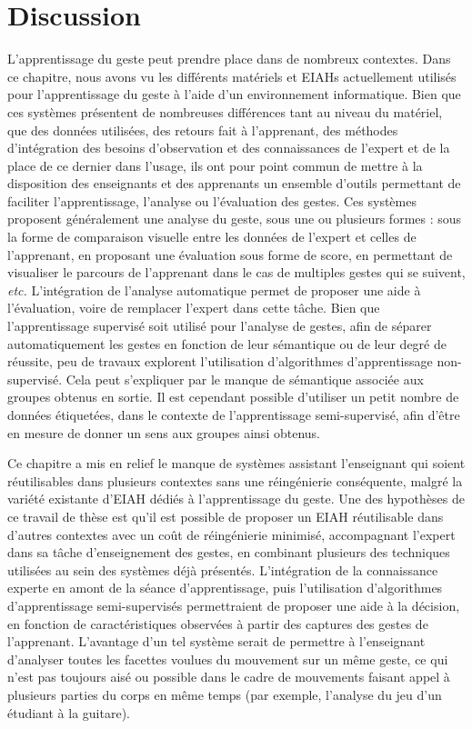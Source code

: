 \section{Discussion}
L'apprentissage du geste peut prendre place dans de nombreux contextes. Dans ce chapitre, nous avons vu les différents matériels et EIAHs actuellement utilisés pour l'apprentissage du geste à l'aide d'un environnement informatique. Bien que ces systèmes présentent de nombreuses différences tant au niveau du matériel, que des données utilisées, des retours fait à l'apprenant, des méthodes d'intégration des besoins d'observation et des connaissances de l'expert et de la place de ce dernier dans l'usage, ils ont pour point commun de mettre à la disposition des enseignants et des apprenants un ensemble d'outils permettant de faciliter l'apprentissage, l'analyse ou l'évaluation des gestes. Ces systèmes proposent généralement une analyse du geste, sous une ou plusieurs formes : sous la forme de comparaison visuelle entre les données de l'expert et celles de l'apprenant, en proposant une évaluation sous forme de score, en permettant de visualiser le parcours de l'apprenant dans le cas de multiples gestes qui se suivent, \textit{etc.} L'intégration de l'analyse automatique permet de proposer une aide à l'évaluation, voire de remplacer l'expert dans cette tâche. Bien que l'apprentissage supervisé soit utilisé pour l'analyse de gestes, afin de séparer automatiquement les gestes en fonction de leur sémantique ou de leur degré de réussite, peu de travaux explorent l'utilisation d'algorithmes d'apprentissage non-supervisé. Cela peut s'expliquer par le manque de sémantique associée aux groupes obtenus en sortie. Il est cependant possible d'utiliser un petit nombre de données étiquetées, dans le contexte de l'apprentissage semi-supervisé, afin d'être en mesure de donner un sens aux groupes ainsi obtenus.

Ce chapitre a mis en relief le manque de systèmes assistant l'enseignant qui soient réutilisables dans plusieurs contextes sans une réingénierie conséquente, malgré la variété existante d'EIAH dédiés à l'apprentissage du geste. Une des hypothèses de ce travail de thèse est qu'il est possible de proposer un EIAH réutilisable dans d'autres contextes avec un coût de réingénierie minimisé, accompagnant l'expert dans sa tâche d'enseignement des gestes, en combinant plusieurs des techniques utilisées au sein des systèmes déjà présentés. L'intégration de la connaissance experte en amont de la séance d'apprentissage, puis l'utilisation d'algorithmes d'apprentissage semi-supervisés permettraient de proposer une aide à la décision, en fonction de caractéristiques observées à partir des captures des gestes de l'apprenant. L'avantage d'un tel système serait de permettre à l'enseignant d'analyser toutes les facettes voulues du mouvement sur un même geste, ce qui n'est pas toujours aisé ou possible dans le cadre de mouvements faisant appel à plusieurs parties du corps en même temps (par exemple, l'analyse du jeu d'un étudiant à la guitare).

